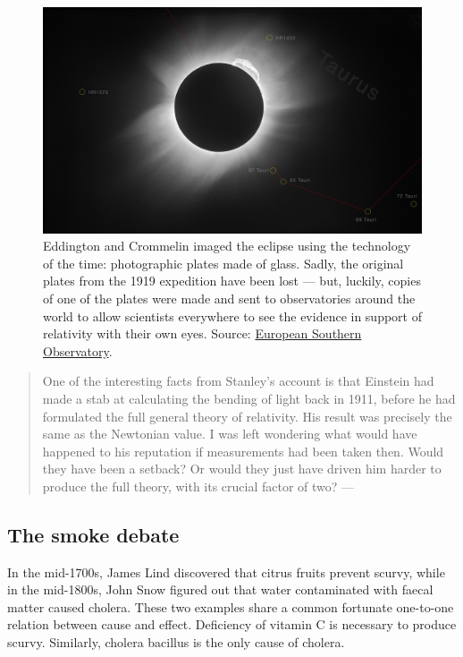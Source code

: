 \documentclass[
]{book}
\begin{document}
\begin{figure}

{\centering \includegraphics[width=1\linewidth]{Figures/solar_eclipse} 

}

\caption{Eddington and Crommelin imaged the eclipse using the technology of the time: photographic plates made of glass. Sadly, the original plates from the 1919 expedition have been lost --- but, luckily, copies of one of the plates were made and sent to observatories around the world to allow scientists everywhere to see the evidence in support of relativity with their own eyes. Source: \href{https://www.eso.org/public/images/potw1926a/}{European Southern Observatory}.}\label{fig:eddington-eclipse}
\end{figure}

\begin{quote}
One of the interesting facts from Stanley's account is that Einstein had made a stab at calculating the bending of light back in 1911, before he had formulated the full general theory of relativity. His result was precisely the same as the Newtonian value. I was left wondering what would have happened to his reputation if measurements had been taken then. Would they have been a setback? Or would they just have driven him harder to produce the full theory, with its crucial factor of two? --- \citep{coles2019einstein}
\end{quote}

\hypertarget{smoke-debate}{%
\subsection{The smoke debate}\label{smoke-debate}}

In the mid-1700s, James Lind discovered that citrus fruits prevent scurvy, while in the mid-1800s, John Snow figured out that water contaminated with faecal matter caused cholera. These two examples share a common fortunate one-to-one relation between cause and effect. Deficiency of vitamin C is necessary to produce scurvy. Similarly, cholera bacillus is the only cause of cholera.
\end{document}
